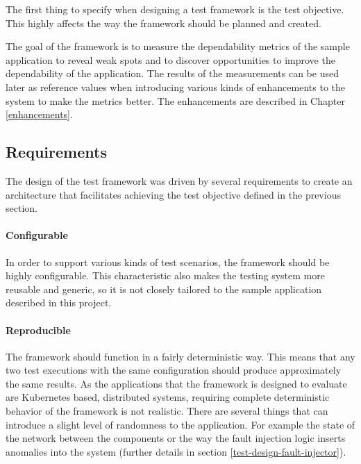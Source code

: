 The first thing to specify when designing a test framework is the test objective. This highly affects the way the framework should be planned and created.

The goal of the framework is to measure the dependability metrics of the sample application to reveal weak spots and to discover opportunities to improve the dependability of the application. The results of the measurements can be used later as reference values when introducing various kinds of enhancements to the system to make the metrics better. The enhancements are described in Chapter \ref{enhancements}.

\subsection{Requirements} \label{test-design-req}

The design of the test framework was driven by several requirements to create an architecture that facilitates achieving the test objective defined in the previous section.

\paragraph{Configurable} In order to support various kinds of test scenarios, the framework should be highly configurable. This characteristic also makes the testing system more reusable and generic, so it is not closely tailored to the sample application described in this project.

\paragraph{Reproducible} The framework should function in a fairly deterministic way. This means that any two test executions with the same configuration should produce approximately the same results. As the applications that the framework is designed to evaluate are Kubernetes based, distributed systems, requiring complete deterministic behavior of the framework is not realistic. There are several things that can introduce a slight level of randomness to the application. For example the state of the network between the components or the way the fault injection logic inserts anomalies into the system (further details in section \ref{test-design-fault-injector}).

